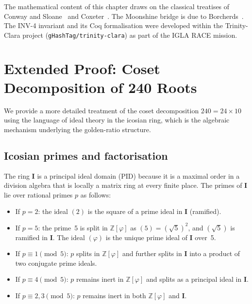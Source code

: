 The mathematical content of this chapter draws on the classical
treatises of Conway and Sloane~\cite{conway_sphere_packings} and
Coxeter~\cite{coxeter_regular_polytopes}.  The Moonshine bridge is
due to Borcherds~\cite{borcherds1992monstrous_moonshine}.  The
INV-4 invariant and its Coq formalisation were developed within the
Trinity-Clara project (\texttt{gHashTag/trinity-clara}) as part of
the IGLA RACE mission.


\section{Extended Proof: Coset Decomposition of 240 Roots}
\label{sec:e8-coset-proof}

We provide a more detailed treatment of the coset decomposition
\(240 = 24 \times 10\) using the language of ideal theory in the
icosian ring, which is the algebraic mechanism underlying the
golden-ratio structure.

\subsection{Icosian primes and factorisation}
\label{subsec:icosian-primes}

The ring \(\mathbf{I}\) is a principal ideal domain (PID) because it
is a maximal order in a division algebra that is locally a matrix ring
at every finite place.  The primes of \(\mathbf{I}\) lie over rational
primes \(p\) as follows:
\begin{itemize}
  \item If \(p = 2\): the ideal \((2)\) is the square of a prime
    ideal in \(\mathbf{I}\) (ramified).
  \item If \(p = 5\): the prime~5 is split in \(\mathbb{Z}[\varphi]\)
    as \((5) = (\sqrt{5})^2\), and \((\sqrt{5})\) is ramified in
    \(\mathbf{I}\).  The ideal \((\varphi)\) is the unique prime
    ideal of \(\mathbf{I}\) over~5.
  \item If \(p \equiv 1 \pmod{5}\): \(p\) splits in \(\mathbb{Z}[\varphi]\)
    and further splits in \(\mathbf{I}\) into a product of two
    conjugate prime ideals.
  \item If \(p \equiv 4 \pmod{5}\): \(p\) remains inert in
    \(\mathbb{Z}[\varphi]\) and splits as a principal ideal in
    \(\mathbf{I}\).
  \item If \(p \equiv 2, 3 \pmod{5}\): \(p\) remains inert in
    both \(\mathbb{Z}[\varphi]\) and \(\mathbf{I}\).
\end{itemize}

